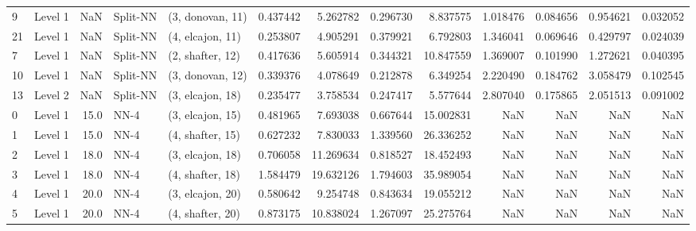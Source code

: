 \begin{tabular}{llrllrrrrrrrr}
9  &   Level 1 &    NaN &    Split-NN &  (3, donovan, 11) &   0.437442 &   5.262782 &  0.296730 &   8.837575 &             1.018476 &               0.084656 &            0.954621 &              0.032052 \\
21 &   Level 1 &    NaN &    Split-NN &  (4, elcajon, 11) &   0.253807 &   4.905291 &  0.379921 &   6.792803 &             1.346041 &               0.069646 &            0.429797 &              0.024039 \\
7  &   Level 1 &    NaN &    Split-NN &  (2, shafter, 12) &   0.417636 &   5.605914 &  0.344321 &  10.847559 &             1.369007 &               0.101990 &            1.272621 &              0.040395 \\
10 &   Level 1 &    NaN &    Split-NN &  (3, donovan, 12) &   0.339376 &   4.078649 &  0.212878 &   6.349254 &             2.220490 &               0.184762 &            3.058479 &              0.102545 \\
13 &   Level 2 &    NaN &    Split-NN &  (3, elcajon, 18) &   0.235477 &   3.758534 &  0.247417 &   5.577644 &             2.807040 &               0.175865 &            2.051513 &              0.091002 \\
0  &   Level 1 &   15.0 &        NN-4 &  (3, elcajon, 15) &   0.481965 &   7.693038 &  0.667644 &  15.002831 &                  NaN &                    NaN &                 NaN &                   NaN \\
1  &   Level 1 &   15.0 &        NN-4 &  (4, shafter, 15) &   0.627232 &   7.830033 &  1.339560 &  26.336252 &                  NaN &                    NaN &                 NaN &                   NaN \\
2  &   Level 1 &   18.0 &        NN-4 &  (3, elcajon, 18) &   0.706058 &  11.269634 &  0.818527 &  18.452493 &                  NaN &                    NaN &                 NaN &                   NaN \\
3  &   Level 1 &   18.0 &        NN-4 &  (4, shafter, 18) &   1.584479 &  19.632126 &  1.794603 &  35.989054 &                  NaN &                    NaN &                 NaN &                   NaN \\
4  &   Level 1 &   20.0 &        NN-4 &  (3, elcajon, 20) &   0.580642 &   9.254748 &  0.843634 &  19.055212 &                  NaN &                    NaN &                 NaN &                   NaN \\
5  &   Level 1 &   20.0 &        NN-4 &  (4, shafter, 20) &   0.873175 &  10.838024 &  1.267097 &  25.275764 &                  NaN &                    NaN &                 NaN &                   NaN \\

\end{tabular}
